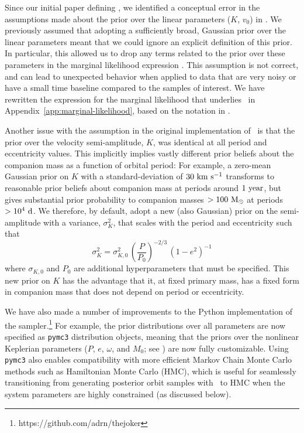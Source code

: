\documentclass[modern]{aastex63}
\begin{document}
Since our initial paper defining \thejoker, we identified a conceptual error in
the assumptions made about the prior over the linear parameters ($K$, $v_0$) in
\citet{thejoker}.
We previously assumed that adopting a sufficiently broad, Gaussian prior over
the linear parameters meant that we could ignore an explicit definition of this
prior.
In particular, this allowed us to drop any terms related to the prior over these
parameters in the marginal likelihood expression \citep[\equationname~11
in][]{thejoker}.
This assumption is not correct, and can lead to unexpected behavior when applied
to data that are very noisy or have a small time baseline compared to the
samples of interest.
We have rewritten the expression for the marginal likelihood that underlies
\thejoker\ in Appendix~\ref{app:marginal-likelihood}, based on the notation in
\cite{Hogg:2020}.

Another issue with the assumption in the original implementation of \thejoker\
is that the prior over the velocity semi-amplitude, $K$, was identical at all
period and eccentricity values.
This implicitly implies vastly different prior beliefs about the companion mass
as a function of orbital period: For example, a zero-mean Gaussian prior on $K$
with a standard-deviation of $30~\mathrm{km}~\mathrm{s}^{-1}$ transforms to reasonable prior beliefs
about companion mass at periods around $1~{\rm year}$, but gives substantial
prior probability to companion masses $>100~\mathrm{M}_\odot$ at periods $>10^4~\mathrm{d}$.
We therefore, by default, adopt a new (also Gaussian) prior on the
semi-amplitude with a variance, $\sigma^2_K$, that scales with the
period and eccentricity such that
\begin{equation}
    \sigma^2_K = \sigma^2_{K, 0} \, \left(\frac{P}{P_0}\right)^{-2/3} \,
        \left(1 - e^2\right)^{-1} \label{eq:sigK}
\end{equation}
where $\sigma_{K, 0}$ and $P_0$ are additional hyperparameters that must be
specified.
This new prior on $K$ has the advantage that it, at fixed primary mass, has a
fixed form in companion mass that does not depend on period or eccentricity.

We have also made a number of improvements to the Python implementation of the
sampler.\footnote{https://github.com/adrn/thejoker}
For example, the prior distributions over all parameters are now specified as
\texttt{pymc3} \citep{Salvatier2016} distribution objects, meaning that the
priors over the nonlinear Keplerian parameters ($P$, $e$, $\omega$, and $M_0$;
see \citealt{thejoker}) are now fully customizable.
Using \texttt{pymc3} also enables compatibility with more efficient Markov Chain
Monte Carlo methods such as Hamiltonian Monte Carlo (HMC), which is useful for
seamlessly transitioning from generating posterior orbit samples with \thejoker\
to HMC when the system parameters are highly constrained (as discussed below).
\end{document}
